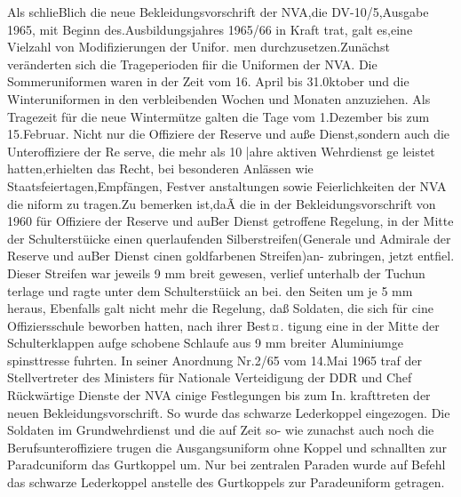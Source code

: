 Als schlieBlich die neue Bekleidungsvorschrift
der NVA,die DV-10/5,Ausgabe 1965, mit Beginn
des.Ausbildungsjahres 1965/66 in Kraft trat, galt
es,eine Vielzahl von Modifizierungen der Unifor.
men durchzusetzen.Zunächst veränderten sich die
Trageperioden fiir die Uniformen der NVA. Die
Sommeruniformen waren in der Zeit vom 16. April
bis 31.0ktober und die Winteruniformen in den
verbleibenden Wochen und Monaten anzuziehen.
Als Tragezeit für die neue Wintermütze galten die
Tage vom 1.Dezember bis zum 15.Februar.
Nicht nur die Offiziere der Reserve und auße
Dienst,sondern auch die Unteroffiziere der Re
serve, die mehr als 10 |ahre aktiven Wehrdienst ge
leistet hatten,erhielten das Recht, bei besonderen
Anlässen wie Staatsfeiertagen,Empfängen, Festver
anstaltungen sowie Feierlichkeiten der NVA die
niform zu tragen.Zu bemerken ist,daÃ die in der
Bekleidungsvorschrift von 1960 für Offiziere der
Reserve und auBer Dienst getroffene Regelung, in
der Mitte der Schulterstüicke einen querlaufenden
Silberstreifen(Generale und Admirale der Reserve
und auBer Dienst cinen goldfarbenen Streifen)an-
zubringen, jetzt entfiel. Dieser Streifen war jeweils
9 mm breit gewesen, verlief unterhalb der Tuchun
terlage und ragte unter dem Schulterstüick an bei.
den Seiten um je 5 mm heraus, Ebenfalls galt nicht
mehr die Regelung, daß Soldaten, die sich für cine
Offiziersschule beworben hatten, nach ihrer Best¤.
tigung eine in der Mitte der Schulterklappen aufge
schobene Schlaufe aus 9 mm breiter Aluminiumge
spinsttresse fuhrten.
In seiner Anordnung Nr.2/65 vom 14.Mai 1965
traf der Stellvertreter des Ministers für Nationale
Verteidigung der DDR und Chef Rückwärtige
Dienste der NVA cinige Festlegungen bis zum In.
krafttreten der neuen Bekleidungsvorschrift.
So
wurde das schwarze Lederkoppel eingezogen. Die
Soldaten im Grundwehrdienst und die auf Zeit so-
wie zunachst auch noch die Berufsunteroffiziere
trugen die Ausgangsuniform ohne Koppel und schnallten zur Paradcuniform das Gurtkoppel um.
Nur bei zentralen Paraden wurde auf Befehl das
schwarze Lederkoppel anstelle des Gurtkoppels zur
Paradeuniform getragen.